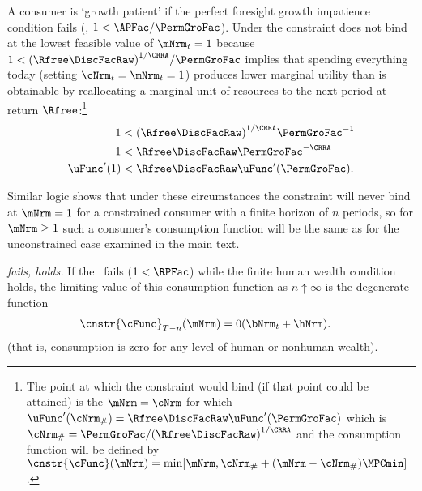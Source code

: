 \documentclass[\econtexRoot/BufferStockTheory]{subfiles}
\begin{document}
A consumer is `growth patient' if the perfect foresight growth
impatience condition fails (\cncl{\GICRaw}, $1 < \APFac/\PermGroFac$).  Under
\cncl{\GICRaw} the constraint does not bind at the lowest feasible value of $\mNrm_{t}=1$ because
$1 < {(\Rfree\DiscFacRaw)}^{1/\CRRA}/\PermGroFac$ implies that spending
everything today (setting $\cNrm_{t}=\mNrm_{t}=1$) produces lower
marginal utility than is obtainable by reallocating a marginal unit of
resources to the next period at return $\Rfree$:\footnote{The point at
  which the constraint would bind (if that point could be attained) is
  the $\mNrm=\cNrm$ for which $\uFunc^{\prime}(\cNrm_{\#}) = \Rfree
  \DiscFacRaw \uFunc^{\prime}(\PermGroFac)$ which is $\cNrm_{\#} =
  \PermGroFac/{(\Rfree \DiscFacRaw)}^{1/\CRRA}$ and the consumption function
  will be defined by
  $\cnstr{\cFunc}(\mNrm)=\min[\mNrm,\cNrm_{\#}+(\mNrm-\cNrm_{\#})\MPCmin
  ]$.}
\begin{equation}\begin{gathered}\begin{aligned}
  1  & < {(\Rfree \DiscFacRaw)}^{1/\CRRA}\PermGroFac^{-1}    \notag
  \\ 1  & < \Rfree \DiscFacRaw \PermGroFac^{-\CRRA} \notag
  \\  \uFunc^{\prime}(1)  & < \Rfree \DiscFacRaw \uFunc^{\prime}(\PermGroFac)   \label{eq:EulerGICRawFailsEnd}.
\end{aligned}\end{gathered}\end{equation}

Similar logic shows that under these circumstances the constraint will never bind at $\mNrm=1$ for a constrained consumer with a finite horizon of $n$ periods, so for $\mNrm \geq 1$ such a consumer's consumption function will be the same as for the unconstrained case examined in the main text.

\hypertarget{cnclGICRawcnclRICFHWC}{}

\textit{{\RIC} fails, {\FHWC} holds.} If the \RIC~fails ($1 < \RPFac$) while the finite human wealth condition
holds, the limiting value of this consumption function as $n \uparrow
\infty$ is the degenerate function
\begin{equation}\begin{gathered}\begin{aligned}
  \cnstr{\cFunc}_{T-n}(\mNrm)  & = 0 (\bNrm_{t}+\hNrm).
\end{aligned}\end{gathered}\end{equation}
(that is, consumption is zero for any level of human or nonhuman wealth).
\end{document}
